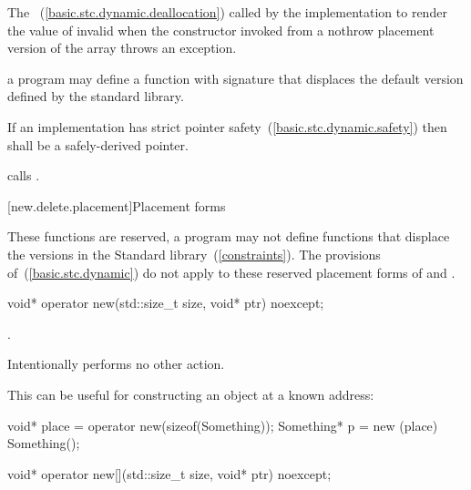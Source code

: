 \begin{itemdescr}
\pnum
\effects
The
~(\ref{basic.stc.dynamic.deallocation})
called by the implementation
to render the value of  invalid
when the constructor invoked from a nothrow
placement version of the array  throws an exception.

\pnum
\replaceable
a \Cpp program may define a function with signature
that displaces the default version defined by the
\Cpp standard library.

\pnum
\requires
If an implementation has strict pointer safety~(\ref{basic.stc.dynamic.safety})
then  shall be a safely-derived pointer.

\pnum
{}
{} calls
.
\end{itemdescr}

[new.delete.placement]{Placement forms}

\pnum
These functions are reserved, a \Cpp program may not define functions that displace
the versions in the Standard \Cpp library~(\ref{constraints}).
The provisions of~(\ref{basic.stc.dynamic}) do not apply to these reserved
placement forms of  and .

%
\begin{itemdecl}
void* operator new(std::size_t size, void* ptr) noexcept;
\end{itemdecl}

\begin{itemdescr}
\pnum
\returns
{}.

\pnum
\notes
Intentionally performs no other action.

\pnum
\enterexample
This can be useful for constructing an object at a known address:

\begin{codeblock}
void* place = operator new(sizeof(Something));
Something* p = new (place) Something();
\end{codeblock}
\exitexample
\end{itemdescr}

%
\begin{itemdecl}
void* operator new[](std::size_t size, void* ptr) noexcept;
\end{itemdecl}

